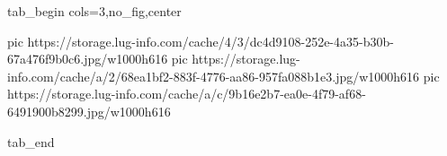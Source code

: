  
 
 
 
 


\ifcmt
  tab_begin cols=3,no_fig,center

     pic https://storage.lug-info.com/cache/4/3/dc4d9108-252e-4a35-b30b-67a476f9b0c6.jpg/w1000h616
		 pic https://storage.lug-info.com/cache/a/2/68ea1bf2-883f-4776-aa86-957fa088b1e3.jpg/w1000h616
		 pic https://storage.lug-info.com/cache/a/c/9b16e2b7-ea0e-4f79-af68-6491900b8299.jpg/w1000h616

  tab_end
\fi
